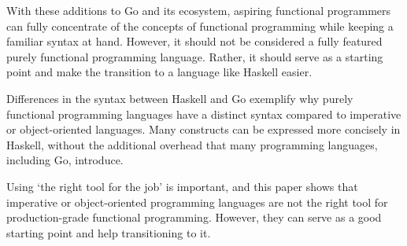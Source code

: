 
With these additions to Go and its ecosystem, aspiring functional programmers
can fully concentrate of the concepts of functional programming while keeping
a familiar syntax at hand. However, it should not be considered a fully featured
purely functional programming language. Rather, it should serve as a starting point and
make the transition to a language like Haskell easier.

Differences in the syntax between Haskell and Go exemplify why purely functional programming
languages have a distinct syntax compared to imperative or object-oriented languages.
Many constructs can be expressed more concisely in Haskell, without the additional
overhead that many programming languages, including Go, introduce.

Using `the right tool for the job' is important, and this paper shows that imperative or
object-oriented programming languages are not the right tool for production-grade
functional programming. However, they can serve as a good starting point and help transitioning
to it.
